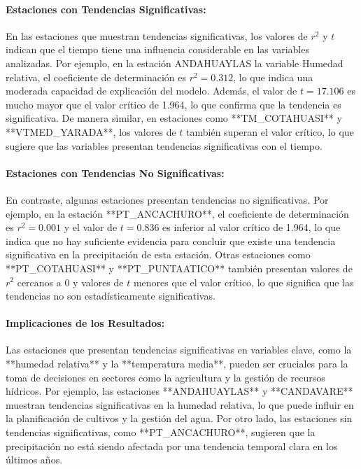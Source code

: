 \paragraph{Estaciones con Tendencias Significativas:} En las estaciones que muestran tendencias significativas, los valores de \(r^2\) y \(t\) indican que el tiempo tiene una influencia considerable en las variables analizadas. Por ejemplo, en la estación ANDAHUAYLAS la variable Humedad relativa, el coeficiente de determinación es \(r^2 = 0.312\), lo que indica una moderada capacidad de explicación del modelo. Además, el valor de \(t = 17.106\) es mucho mayor que el valor crítico de 1.964, lo que confirma que la tendencia es significativa. De manera similar, en estaciones como **TM\_COTAHUASI** y **VTMED\_YARADA**, los valores de \(t\) también superan el valor crítico, lo que sugiere que las variables presentan tendencias significativas con el tiempo.

\paragraph{Estaciones con Tendencias No Significativas:} En contraste, algunas estaciones presentan tendencias no significativas. Por ejemplo, en la estación **PT\_ANCACHURO**, el coeficiente de determinación es \(r^2 = 0.001\) y el valor de \(t = 0.836\) es inferior al valor crítico de 1.964, lo que indica que no hay suficiente evidencia para concluir que existe una tendencia significativa en la precipitación de esta estación. Otras estaciones como **PT\_COTAHUASI** y **PT\_PUNTAATICO** también presentan valores de \(r^2\) cercanos a 0 y valores de \(t\) menores que el valor crítico, lo que significa que las tendencias no son estadísticamente significativas.

\paragraph{Implicaciones de los Resultados:} Las estaciones que presentan tendencias significativas en variables clave, como la **humedad relativa** y la **temperatura media**, pueden ser cruciales para la toma de decisiones en sectores como la agricultura y la gestión de recursos hídricos. Por ejemplo, las estaciones **ANDAHUAYLAS** y **CANDAVARE** muestran tendencias significativas en la humedad relativa, lo que puede influir en la planificación de cultivos y la gestión del agua. Por otro lado, las estaciones sin tendencias significativas, como **PT\_ANCACHURO**, sugieren que la precipitación no está siendo afectada por una tendencia temporal clara en los últimos años.

